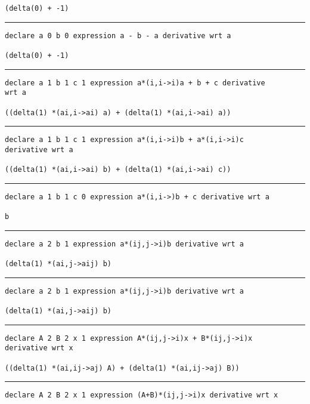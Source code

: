 \documentclass[12pt, a4paper]{report} %
\begin{document}
\begin{multicols}{2}
\begin{verbatim}
(delta(0) + -1)
\end{verbatim}
\vspace{-20pt} \rule[-10pt]{\columnwidth}{0.1pt} 
\begin{verbatim}
declare a 0 b 0 expression a - b - a derivative wrt a

(delta(0) + -1)
\end{verbatim}
\vspace{-20pt} \rule[-10pt]{\columnwidth}{0.1pt} 
\begin{verbatim}
declare a 1 b 1 c 1 expression a*(i,i->i)a + b + c derivative 
wrt a

((delta(1) *(ai,i->ai) a) + (delta(1) *(ai,i->ai) a))
\end{verbatim}
\vspace{-20pt} \rule[-10pt]{\columnwidth}{0.1pt} 
\begin{verbatim}
declare a 1 b 1 c 1 expression a*(i,i->i)b + a*(i,i->i)c 
derivative wrt a

((delta(1) *(ai,i->ai) b) + (delta(1) *(ai,i->ai) c))
\end{verbatim}
\vspace{-20pt} \rule[-10pt]{\columnwidth}{0.1pt} 
\begin{verbatim}
declare a 1 b 1 c 0 expression a*(i,i->)b + c derivative wrt a

b
\end{verbatim}
\vspace{-20pt} \rule[-10pt]{\columnwidth}{0.1pt} 
\begin{verbatim}
declare a 2 b 1 expression a*(ij,j->i)b derivative wrt a

(delta(1) *(ai,j->aij) b)
\end{verbatim}
\vspace{-20pt} \rule[-10pt]{\columnwidth}{0.1pt} 
\begin{verbatim}
declare a 2 b 1 expression a*(ij,j->i)b derivative wrt a

(delta(1) *(ai,j->aij) b)
\end{verbatim}
\vspace{-20pt} \rule[-10pt]{\columnwidth}{0.1pt} 
\begin{verbatim}
declare A 2 B 2 x 1 expression A*(ij,j->i)x + B*(ij,j->i)x 
derivative wrt x

((delta(1) *(ai,ij->aj) A) + (delta(1) *(ai,ij->aj) B))
\end{verbatim}
\vspace{-20pt} \rule[-10pt]{\columnwidth}{0.1pt} 
\begin{verbatim}
declare A 2 B 2 x 1 expression (A+B)*(ij,j->i)x derivative wrt x


\end{verbatim}
\end{multicols}
\end{document}
